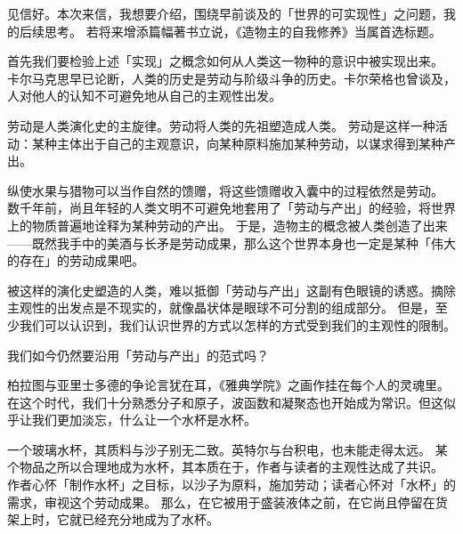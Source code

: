 \documentclass[a4paper,11pt]{article}
\begin{document}
\rmfamily
\chineseindenting


\vspace{1em}

见信好。本次来信，我想要介绍，围绕早前谈及的「世界的可实现性」之问题，我的后续思考。
若将来增添篇幅著书立说，《造物主的自我修养》当属首选标题。






首先我们要检验上述「实现」之概念如何从人类这一物种的意识中被实现出来。
卡尔马克思早已论断，人类的历史是劳动与阶级斗争的历史。卡尔荣格也曾谈及，人对他人的认知不可避免地从自己的主观性出发。

劳动是人类演化史的主旋律。劳动将人类的先祖塑造成人类。
劳动是这样一种活动：某种主体出于自己的主观意识，向某种原料施加某种劳动，以谋求得到某种产出。

纵使水果与猎物可以当作自然的馈赠，将这些馈赠收入囊中的过程依然是劳动。
数千年前，尚且年轻的人类文明不可避免地套用了「劳动与产出」的经验，将世界上的物质普遍地诠释为某种劳动的产出。
于是，造物主的概念被人类创造了出来——既然我手中的美酒与长矛是劳动成果，那么这个世界本身也一定是某种「伟大的存在」的劳动成果吧。

被这样的演化史塑造的人类，难以抵御「劳动与产出」这副有色眼镜的诱惑。摘除主观性的出发点是不现实的，就像晶状体是眼球不可分割的组成部分。
但是，至少我们可以认识到，我们认识世界的方式以怎样的方式受到我们的主观性的限制。

我们如今仍然要沿用「劳动与产出」的范式吗？








柏拉图与亚里士多德的争论言犹在耳，《雅典学院》之画作挂在每个人的灵魂里。
在这个时代，我们十分熟悉分子和原子，波函数和凝聚态也开始成为常识。但这似乎让我们更加淡忘，什么让一个水杯是水杯。

一个玻璃水杯，其质料与沙子别无二致。英特尔与台积电，也未能走得太远。
某个物品之所以合理地成为水杯，其本质在于，作者与读者的主观性达成了共识。
作者心怀「制作水杯」之目标，以沙子为原料，施加劳动；读者心怀对「水杯」的需求，审视这个劳动成果。
那么，在它被用于盛装液体之前，在它尚且停留在货架上时，它就已经充分地成为了水杯。
\end{document}
